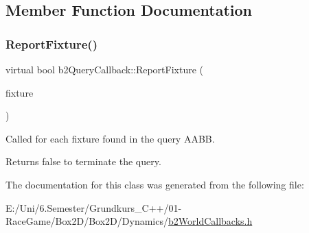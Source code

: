 \subsection{Member Function Documentation}
\mbox{\label{classb2_query_callback_a187dd04dd0f5164fb05c2ce2cbfd9ee5}} 
\subsubsection{\texorpdfstring{ReportFixture()}{ReportFixture()}}
{\footnotesize\ttfamily virtual bool b2\+Query\+Callback\+::\+Report\+Fixture (\begin{DoxyParamCaption}\item[{\mbox{\hyperlink{classb2_fixture}{b2\+Fixture}} $\ast$}]{fixture }\end{DoxyParamCaption})\hspace{0.3cm}{\ttfamily [pure virtual]}}

Called for each fixture found in the query A\+A\+BB. \begin{DoxyReturn}{Returns}
false to terminate the query. 
\end{DoxyReturn}


The documentation for this class was generated from the following file\+:\begin{DoxyCompactItemize}
\item 
E\+:/\+Uni/6.\+Semester/\+Grundkurs\+\_\+\+C++/01-\/\+Race\+Game/\+Box2\+D/\+Box2\+D/\+Dynamics/\mbox{\hyperlink{b2_world_callbacks_8h}{b2\+World\+Callbacks.\+h}}\end{DoxyCompactItemize}
